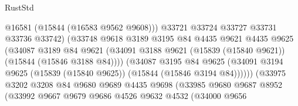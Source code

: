 \begin{lexlean}{RustStd}
\begin{coremodule}
                                        @16581
                                        (@15844 (@16583 @9562 @9608)))
                                      @33721
                                      @33724
                                      @33727
                                      @33731
                                      @33736
                                      @33742)
                                    (@33748
                                      @9618
                                      @3189
                                      @3195
                                      @84
                                      @4435
                                      @9621
                                      @4435
                                      @9625
                                      (@34087
                                        @3189
                                        @84
                                        @9621
                                        (@34091
                                          @3188
                                          @9621
                                          (@15839 (@15840 @9621))
                                          (@15844 (@15846 @3188 @84))))
                                      (@34087
                                        @3195
                                        @84
                                        @9625
                                        (@34091
                                          @3194
                                          @9625
                                          (@15839 (@15840 @9625))
                                          (@15844 (@15846 @3194 @84))))))
                                  (@33975
                                    @3202
                                    @3208
                                    @84
                                    @9680
                                    @9689
                                    @4435
                                    @9698
                                    (@33985
                                      @9680
                                      @9687
                                      @8952
                                      (@33992
                                        @9667
                                        @9679
                                        @9686
                                        @4526
                                        @9632
                                        @4532
                                        (@34000
                                          @9656

\end{coremodule}
\end{lexlean}
